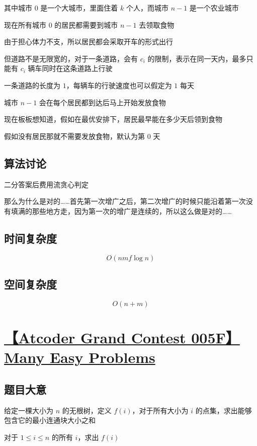 \documentclass[UTF8]{article}
\begin{document}
其中城市 $0$ 是一个大城市，里面住着 $k$ 个人，而城市 $n-1$ 是一个农业城市

现在所有城市 $0$ 的居民都需要到城市 $n-1$ 去领取食物

由于担心体力不支，所以居民都会采取开车的形式出行

但道路不是无限宽的，对于一条道路，会有 $c_i$ 的限制，表示在同一天内，最多只能有 $c_i$ 辆车同时在这条道路上行驶

一条道路的长度为 $1$，每辆车的行驶速度也可以假定为 $1$ 每天

城市 $n-1$ 会在每个居民都到达后马上开始发放食物

现在板板想知道，假如在最优安排下，居民最早能在多少天后领到食物

假如没有居民那就不需要发放食物，默认为第 $0$ 天

\subsection{算法讨论}

二分答案后费用流贪心判定

那么为什么是对的……首先第一次增广之后，第二次增广的时候只能沿着第一次没有填满的那些地方走，因为第一次的增广是连续的，所以这么做是对的……

\subsection{时间复杂度}

$$
O(nmf \log n)
$$

\subsection{空间复杂度}

$$
O(n+m)
$$

\section{\href{https://agc005.contest.atcoder.jp/tasks/agc005_f}{【Atcoder Grand Contest 005F】Many Easy Problems}}

\subsection{题目大意}

给定一棵大小为 $n$ 的无根树，定义 $f(i)$，对于所有大小为 $i$ 的点集，求出能够包含它的最小连通块大小之和

对于 $1 \le i \le n$ 的所有 $i$，求出 $f(i)$
\end{document}
